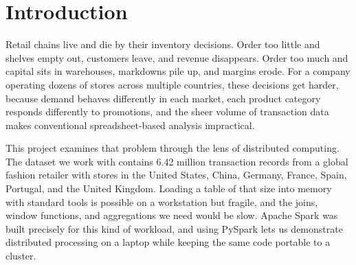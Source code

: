 \documentclass[11pt,a4paper]{article}
\begin{document}
\begin{abstract}
\noindent
This report describes the design and implementation of a distributed analytics pipeline that studies demand behaviour in a multinational fashion retail chain and turns the resulting forecasts into concrete inventory decisions. Working from a public dataset of 6.42 million point-of-sale records covering 35 stores in seven countries, the pipeline performs ingestion, cleaning, integration, exploratory analysis, feature engineering, demand forecasting, and an inventory recommendation stage. Three regression models were trained on Spark MLlib with cross-validated hyperparameter search. A random forest regressor achieved an $R^2$ of 0.8208 on a held-out chronological test set, beating a naive persistence baseline by roughly 26\% in RMSE. The final stage converts forecasts into safety stock levels, reorder points, and per-segment replenishment recommendations. A web dashboard exposes the results for non-technical users. The report discusses dataset limitations openly and suggests paths for further work.
\end{abstract}

\tableofcontents
\newpage

\section{Introduction}

Retail chains live and die by their inventory decisions. Order too little and shelves empty out, customers leave, and revenue disappears. Order too much and capital sits in warehouses, markdowns pile up, and margins erode. For a company operating dozens of stores across multiple countries, these decisions get harder, because demand behaves differently in each market, each product category responds differently to promotions, and the sheer volume of transaction data makes conventional spreadsheet-based analysis impractical.

This project examines that problem through the lens of distributed computing. The dataset we work with contains 6.42 million transaction records from a global fashion retailer with stores in the United States, China, Germany, France, Spain, Portugal, and the United Kingdom. Loading a table of that size into memory with standard tools is possible on a workstation but fragile, and the joins, window functions, and aggregations we need would be slow. Apache Spark was built precisely for this kind of workload, and using PySpark lets us demonstrate distributed processing on a laptop while keeping the same code portable to a cluster.
\end{document}
